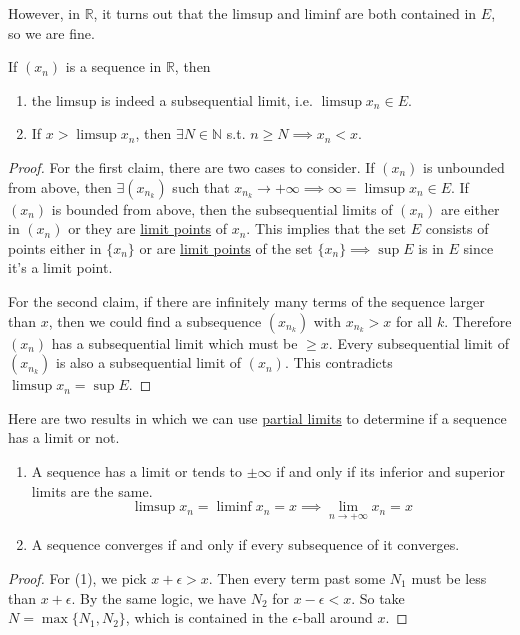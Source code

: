   However, in $\mathbb{R}$, it turns out that the limsup and liminf are both contained in $E$, so we are fine. 

  \begin{lemma}
    \label{thm:sequence-limsup-indeed-subsequential-limit}
 
    If $(x_n)$ is a sequence in $\mathbb{R}$, then 
    \begin{enumerate}
      \item the limsup is indeed a subsequential limit, i.e. $\limsup x_n \in E$. 
      \item If $x > \limsup x_n$, then $\exists N \in \mathbb{N}$ s.t. $n \geq N \implies x_n < x$. 
    \end{enumerate}
  \end{lemma}
  \begin{proof}
    For the first claim, there are two cases to consider. If $(x_n)$ is unbounded from above, then $\exists (x_{n_k})$ such that $x_{n_k} \rightarrow +\infty \implies \infty = \limsup x_n \in E$. If $(x_n)$ is bounded from above, then the subsequential limits of $(x_n)$ are either in $(x_n)$ or they are \hyperref[pst-def:limit-point]{limit points} of $x_n$. This implies that the set $E$ consists of points either in $\{x_n\}$ or are \hyperref[pst-def:limit-point]{limit points} of the set $\{x_n\} \implies \sup{E}$ is in $E$ since it's a limit point. 

    For the second claim, if there are infinitely many terms of the sequence larger than $x$, then we could find a subsequence $(x_{n_k})$ with $x_{n_k} > x$ for all $k$. Therefore $(x_n)$ has a subsequential limit which must be $\geq x$. Every subsequential limit of $(x_{n_k})$ is also a subsequential limit of $(x_n)$. This contradicts $\limsup x_n = \sup E$. 
  \end{proof}

  \begin{theorem}
    \label{thm:requirements-of-partial-limits-for-limit-to}
    Here are two results in which we can use \hyperref[pst-def:partial-limits]{partial limits} to determine if a sequence has a limit or not. 
    \begin{enumerate}
      \item A sequence has a limit or tends to $\pm \infty$ if and only if its inferior and superior limits are the same. 
      \begin{equation}
        \limsup x_n = \liminf x_n = x \implies \lim_{n \rightarrow +\infty} x_n = x
      \end{equation}
      \item A sequence converges if and only if every subsequence of it converges. 
    \end{enumerate}
  \end{theorem}
  \begin{proof}
    For (1), we pick $x + \epsilon > x$. Then every term past some $N_1$ must be less than $x + \epsilon$. By the same logic, we have $N_2$ for $x - \epsilon < x$. So take $N = \max\{N_1, N_2\}$, which is contained in the $\epsilon$-ball around $x$. 
  \end{proof}

